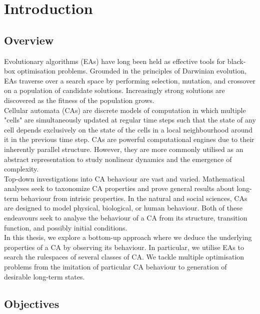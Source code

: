 \chapter{Introduction}

\section{Overview}

Evolutionary algorithms (EAs) have long been held as effective tools for black-box optimisation problems. Grounded in the principles of Darwinian evolution, EAs traverse over a search space by performing selection, mutation, and crossover on a population of candidate solutions. Increasingly strong solutions are discovered as the fitness of the population grows.\\

Cellular automata (CAs) are discrete models of computation in which multiple "cells" are simultaneously updated at regular time steps such that the state of any cell depends exclusively on the state of the cells in a local neighbourhood around it in the previous time step. CAs are powerful computational engines due to their inherently parallel structure. However, they are more commonly utilised as an abstract representation to study nonlinear dynamics and the emergence of complexity.\\

Top-down investigations into CA behaviour are vast and varied. Mathematical analyses seek to taxonomize CA properties and prove general results about long-term behaviour from intrisic properties. In the natural and social sciences, CAs are designed to model physical, biological, or human behaviour. Both of these endeavours seek to analyse the behaviour of a CA from its structure, transition function, and possibly initial conditions.\\

In this thesis, we explore a bottom-up approach where we deduce the underlying properties of a CA by observing its behaviour. In particular, we utilise EAs to search the rulespaces of several classes of CA. We tackle multiple optimisation problems from the imitation of particular CA behaviour to generation of desirable long-term states.\\

\section{Objectives}

